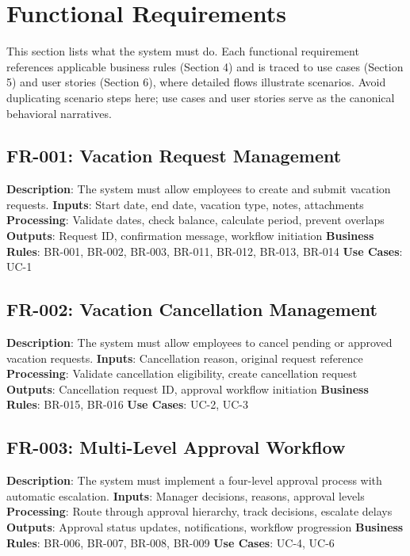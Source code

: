 \documentclass[12pt,a4paper]{article}
\begin{document}
\section{Functional Requirements}

This section lists what the system must do. Each functional requirement references applicable business rules (Section 4) and is traced to use cases (Section 5) and user stories (Section 6), where detailed flows illustrate scenarios. Avoid duplicating scenario steps here; use cases and user stories serve as the canonical behavioral narratives.

\subsection{FR-001: Vacation Request Management}
\textbf{Description}: The system must allow employees to create and submit vacation requests.
\textbf{Inputs}: Start date, end date, vacation type, notes, attachments
\textbf{Processing}: Validate dates, check balance, calculate period, prevent overlaps
\textbf{Outputs}: Request ID, confirmation message, workflow initiation
\textbf{Business Rules}: BR-001, BR-002, BR-003, BR-011, BR-012, BR-013, BR-014
\textbf{Use Cases}: UC-1

\subsection{FR-002: Vacation Cancellation Management}
\textbf{Description}: The system must allow employees to cancel pending or approved vacation requests.
\textbf{Inputs}: Cancellation reason, original request reference
\textbf{Processing}: Validate cancellation eligibility, create cancellation request
\textbf{Outputs}: Cancellation request ID, approval workflow initiation
\textbf{Business Rules}: BR-015, BR-016
\textbf{Use Cases}: UC-2, UC-3

\subsection{FR-003: Multi-Level Approval Workflow}
\textbf{Description}: The system must implement a four-level approval process with automatic escalation.
\textbf{Inputs}: Manager decisions, reasons, approval levels
\textbf{Processing}: Route through approval hierarchy, track decisions, escalate delays
\textbf{Outputs}: Approval status updates, notifications, workflow progression
\textbf{Business Rules}: BR-006, BR-007, BR-008, BR-009
\textbf{Use Cases}: UC-4, UC-6
\end{document}
